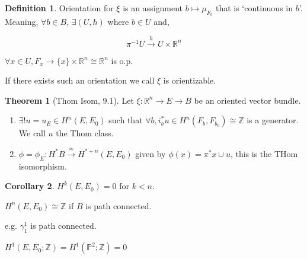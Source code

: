 \documentclass{article}
\theoremstyle{definition}
\newtheorem*{definition}{Definition}
\newtheorem{theorem}{Theorem}
\newtheorem{corollary}[theorem]{Corollary}
\begin{document}
    \begin{definition}
        Orientation for \(\xi\) is an assignment \(b \mapsto \mu_{F_b}\) that is `continuous in \(b\)'. Meaning, \(\forall b \in B\), \(\exists (U, h)\) where \(b\in U\) and,
        
        \[
            \pi ^{-1} U \xrightarrow{h} U \times \mathbb{R}^n
        \]

        \(\forall x\in U, F_x \to \{ x \} \times \mathbb{R}^n \cong \mathbb{R}^n\) is o.p.
    \end{definition}

    If there exists such an orientation we call \(\xi\) is orientizable.

    \begin{theorem}
        [Thom Isom, 9.1] Let \(\xi: \mathbb{R}^n \to E \to B\) be an oriented vector bundle.

        \begin{enumerate}[label=\roman*)]
            \item \(\exists ! u = u_E \in H^n(E,E_0)\) such that \(\forall b, i^{\ast} _b u \in H^n(F_b , F_{b_0}) \cong \mathbb{Z}\) is a generator. We call \(u\) the Thom class.
            \item \(\phi = \phi_E : H^{\ast} B \xrightarrow{\approx} H^{\ast + n} (E, E_0)\) given by \(\phi(x) = \pi ^{\ast} x \cup u\), this is the THom isomorphism.  
        \end{enumerate} 
    \end{theorem}

    \begin{corollary}
        \(H^k(E,E_0) = 0\) for \(k < n\).

        \(H^n(E, E_0) \cong \mathbb{Z}\) if \(B\) is path connected.
        
        e.g. \(\gamma^1_1\) is path connected.

        \(H^1(E,E_0 ; \mathbb{Z}) = H^1(\mathbb{P}^2 ; \mathbb{Z}) = 0\) 
    \end{corollary}
\end{document}
